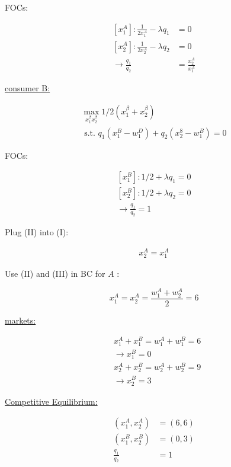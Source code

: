 {{\begin{enumerate}[label=(\alph*)]
{FOCs:

\begin{align*}
    \left[x_{1}^{A}\right]: \frac{1}{2 x_{1}^{A}}-\lambda q_{1} & =0 \\
    {\left[x_{2}^{A}\right]: \frac{1}{2 x_{2}^{A}}-\lambda q_{2} } & =0 \\
    \rightarrow \frac{q_{1}}{q_{2}} &=\frac{x_{2}^{A}}{x_{1}^{A}} \tag{I}
\end{align*}

\underline{consumer B:}

\begin{align*}
    \max_{x_{1}^{\beta} x_{2}^{\beta}} 1 / 2\left(x_{1}^{\beta}+x_{2}^{\beta}\right) \\
    \text { s.t. } q_{1}\left(x_{1}^{B}-w_{1}^{D}\right)+q_{2}\left(x_{2}^{8}-w_{1}^{B}\right)=0 
\end{align*}

FOCs:


\begin{align*}
    \left[x_{1}^{B}\right]: 1 / 2+\lambda q_{1}=0 \\
    \left[x_{2}^{B}\right]: 1 / 2+\lambda q_{2}=0 \\
    \rightarrow \frac{q_{1}}{q_{2}}=1 \tag{II}
\end{align*}

Plug (II) into (I):

\begin{align*}
    x_{2}^{A}=x_{1}^{A} \tag{III}
\end{align*}

Use (II) and (III) in BC for $A$ :

$$
x_{1}^{A}=x_{2}^{A}=\frac{w_{1}^{A}+w_{2}^{A}}{2}=6
$$

\underline{markets:}

$$
\begin{aligned}
& x_{1}^{A}+x_{1}^{B}=w_{1}^{A}+w_{1}^{B}=6 \\
& \longrightarrow x_{1}^{B}=0 \\
& x_{2}^{A}+x_{2}^{B}=w_{2}^{A}+w_{2}^{B}=9 \\
& \longrightarrow x_{2}^{B}=3
\end{aligned}
$$

\underline{Competitive Equilibrium:}

$$
\begin{aligned}
\left(x_{1}^{A}, x_{2}^{A}\right) & =(6,6) \\
\left(x_{1}^{B}, x_{2}^{B}\right) & =(0,3) \\
\frac{q_{1}}{q_{2}} & =1
\end{aligned}
$$
}
{\item 

}
\end{enumerate}}}
